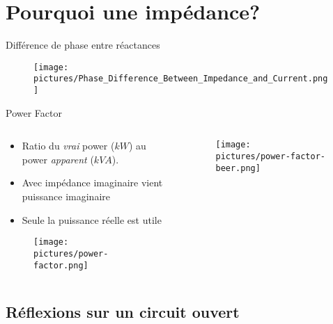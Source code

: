 
\section{Pourquoi une impédance?}

\begin{frame}{Différence de phase entre réactances}
    \begin{figure}
        \centering
        \texttt{[image: pictures/Phase\_Difference\_Between\_Impedance\_and\_Current.png]}
    \end{figure}
\end{frame}

\begin{frame}{Power Factor}
    \begin{columns}
        \begin{column}{0.5\textwidth}
            \begin{itemize}
                \item Ratio du \textit{vrai} power ($kW$) au power \textit{apparent} ($kVA$).
                \item Avec impédance imaginaire vient puissance imaginaire
                \item Seule la puissance réelle est utile
            \end{itemize}
            \begin{figure}
                \centering
                \texttt{[image: pictures/power-factor.png]}
            \end{figure}
        \end{column}
        \begin{column}{0.5\textwidth}
            \begin{figure}
                \centering
                \texttt{[image: pictures/power-factor-beer.png]}
            \end{figure}
        \end{column}
    \end{columns}
\end{frame}


\subsection{Réflexions sur un circuit ouvert}

